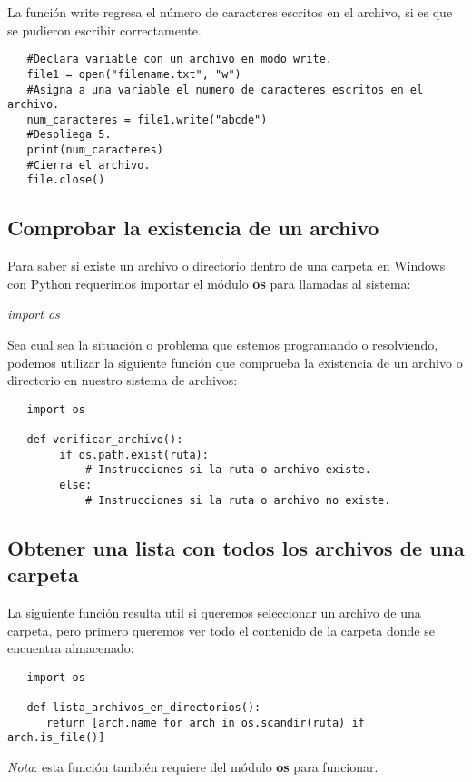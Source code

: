 La función write regresa el número de caracteres escritos en el archivo, si es que se pudieron escribir correctamente.
\begin{lstlisting}
   #Declara variable con un archivo en modo write.
   file1 = open("filename.txt", "w")
   #Asigna a una variable el numero de caracteres escritos en el archivo.
   num_caracteres = file1.write("abcde")
   #Despliega 5.
   print(num_caracteres)
   #Cierra el archivo.
   file.close()
\end{lstlisting}


\subsection{Comprobar la existencia de un archivo}
\hspace{0.55cm}Para saber si existe un archivo o directorio dentro de una carpeta en Windows con Python requerimos importar el módulo \textbf{os} para llamadas al sistema:
\begin{center}
	\textit{import os}
\end{center}

Sea cual sea la situación o problema que estemos programando o resolviendo, podemos utilizar la siguiente función que comprueba la existencia de un archivo o directorio en nuestro sistema de archivos:
\begin{lstlisting}
   import os
   
   def verificar_archivo():
		if os.path.exist(ruta):
   			# Instrucciones si la ruta o archivo existe.
   		else:
   			# Instrucciones si la ruta o archivo no existe.
\end{lstlisting}


\subsection{Obtener una lista con todos los archivos de una carpeta}
\hspace{0.55cm}La siguiente función resulta util si queremos seleccionar un archivo de una carpeta, pero primero queremos ver todo el contenido de la carpeta donde se encuentra almacenado:
\begin{lstlisting}
   import os
   
   def lista_archivos_en_directorios():
      return [arch.name for arch in os.scandir(ruta) if arch.is_file()]
\end{lstlisting}

\textit{Nota}: esta función también requiere del módulo \textbf{os} para funcionar.


